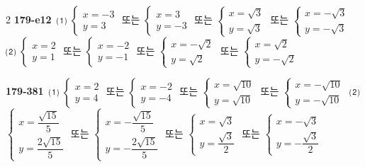 \documentclass[10pt,a4paper]{article}
\begin{document}
\begin{multicols}{2}
\noindent\textbf{179-e12}\ ⑴ $\begin{cases} x=-3 \\ y=3 \end{cases}$ 또는 $\begin{cases} x=3 \\ y=-3 \end{cases}$ 또는 $\begin{cases} x=\sqrt{3} \\ y=\sqrt{3} \end{cases}$ 또는 $\begin{cases} x=-\sqrt{3} \\ y=-\sqrt{3} \end{cases}$ \quad ⑵ $\begin{cases} x=2 \\ y=1 \end{cases}$ 또는 $\begin{cases} x=-2 \\ y=-1 \end{cases}$ 또는 $\begin{cases} x=-\sqrt{2} \\ y=\sqrt{2} \end{cases}$ 또는 $\begin{cases} x=\sqrt{2} \\ y=-\sqrt{2} \end{cases}$\par
\noindent\textbf{179-381}\ ⑴ $\begin{cases} x=2 \\ y=4 \end{cases}$ 또는 $\begin{cases} x=-2 \\ y=-4 \end{cases}$ 또는 $\begin{cases} x=\sqrt{10} \\ y=\sqrt{10} \end{cases}$ 또는 $\begin{cases} x=-\sqrt{10} \\ y=-\sqrt{10} \end{cases}$ \quad ⑵ $\begin{cases} x=\dfrac{\sqrt{15}}{5} \\[4pt] y=\dfrac{2\sqrt{15}}{5} \end{cases}$ 또는 $\begin{cases} x=-\dfrac{\sqrt{15}}{5} \\[4pt] y=-\dfrac{2\sqrt{15}}{5} \end{cases}$ 또는 $\begin{cases} x=\sqrt{3} \\ y=\dfrac{\sqrt{3}}{2} \end{cases}$ 또는 $\begin{cases} x=-\sqrt{3} \\ y=-\dfrac{\sqrt{3}}{2} \end{cases}$\par

\end{multicols}
\end{document}
